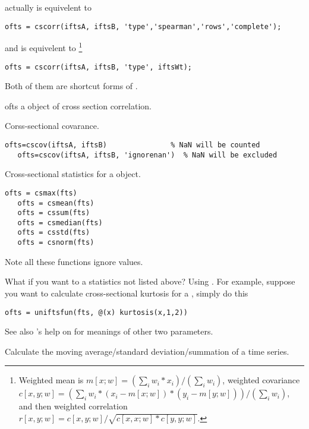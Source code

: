 %
    actually is equivelent to
   \begin{lstlisting}[numbers=none]
   ofts = cscorr(iftsA, iftsB, 'type','spearman','rows','complete');
   \end{lstlisting}
   and  is equivelent to
   \footnote{Weighted mean is $m[x;w] = (\sum_i w_i*x_i)/(\sum_i w_i)$,
				  weighted covariance $c[x,y;w] = (\sum_i w_i*(x_i - m[x;w])*(y_i - m[y;w]))/(\sum_i w_i)$,
				  and then weighted correlation $r[x,y;w] = c[x,y;w]/\sqrt{c[x,x;w]*c[y,y;w]}$.}

   \begin{lstlisting}[numbers=none]
   ofts = cscorr(iftsA, iftsB, 'type', iftsWt);
   \end{lstlisting}
   Both of them are shortcut forms of .

\outarg
   \begin{argdesc}
	 \item [ofts] a \myfints{} object of cross section correlation.
   \end{argdesc}

   Corss-sectional covarance. 

\usage
   \begin{lstlisting}[numbers=none]
   ofts=cscov(iftsA, iftsB)               % NaN will be counted
   ofts=cscov(iftsA, iftsB, 'ignorenan')  % NaN will be excluded 
   \end{lstlisting}

   Cross-sectional statistics for a \myfints{} object.

\usage
   \begin{lstlisting}[numbers=none]
   ofts = csmax(fts)
   ofts = csmean(fts)
   ofts = cssum(fts)
   ofts = csmedian(fts)
   ofts = csstd(fts)
   ofts = csnorm(fts)
   \end{lstlisting}

Note all these functions ignore  values.

What if you want to a statistics not listed above? 
Using .
For example, suppose you want to calculate cross-sectional kurtosis
for a \myfints{}, simply do this
\begin{lstlisting}[numbers=none]
   ofts = uniftsfun(fts, @(x) kurtosis(x,1,2))
\end{lstlisting}
See also \matlab's help on 
for meanings of other two parameters.
\medskip

   Calculate the moving average/standard deviation/summation of a time series.
   
